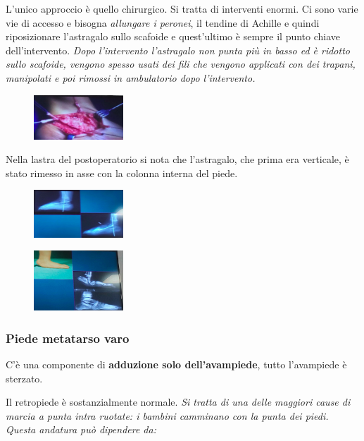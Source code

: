 L'unico approccio è quello chirurgico. Si tratta di interventi enormi.
Ci sono varie vie di accesso e bisogna \emph{allungare i peronei}, il tendine di Achille e quindi riposizionare l'astragalo sullo scafoide e quest'ultimo è sempre il punto chiave dell'intervento. \emph{Dopo l'intervento l'astragalo non punta più in basso ed è ridotto sullo
scafoide, vengono spesso usati dei fili che vengono applicati con dei trapani, manipolati e poi rimossi in ambulatorio dopo l'intervento.}

\begin{figure}[!ht]
\centering
\includegraphics[width=0.3\textwidth]{016/image45.png}
\end{figure}

Nella lastra del postoperatorio si nota che l'astragalo, che prima era verticale, è stato rimesso in asse con la colonna interna del piede.

\begin{figure}[!ht]
\centering
\includegraphics[width=0.3\textwidth]{016/image46.png}
\end{figure}

\begin{figure}[!ht]
\centering
\includegraphics[width=0.3\textwidth]{016/image47.png}
\end{figure}

\subsubsection{Piede metatarso varo}

C'è una componente di \textbf{adduzione solo dell'avampiede}, tutto l'avampiede è sterzato.

Il retropiede è sostanzialmente normale. \emph{Si tratta di una delle maggiori cause di marcia a punta intra ruotate: i bambini camminano con la punta dei piedi. Questa andatura può dipendere da:}

